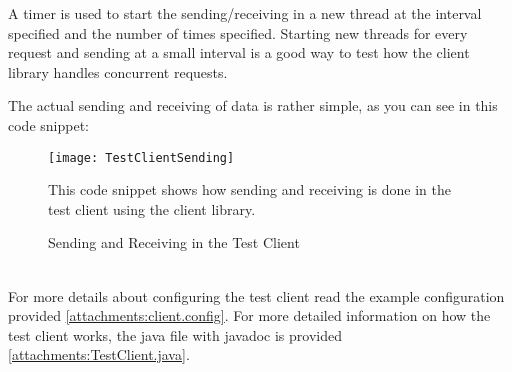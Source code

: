             A timer is used to start the sending/receiving in a new thread at the interval specified and the number of times specified. Starting new threads for every request and sending at a small interval is a good way to test how the client library handles concurrent requests.

            The actual sending and receiving of data is rather simple, as you can see in this code snippet:
            \begin{figure}[h]
                \centering
                \texttt{[image: TestClientSending]}
                \caption{Sending and Receiving in the Test Client}
                This code snippet shows how sending and receiving is done in the test client using the client library.
                \label{fig:TestClientSending}
            \end{figure}
            \\
            For more details about configuring the test client read the example configuration provided \ref{attachments:client.config}. For more detailed information on how the test client works, the java file with javadoc is provided \ref{attachments:TestClient.java}.
